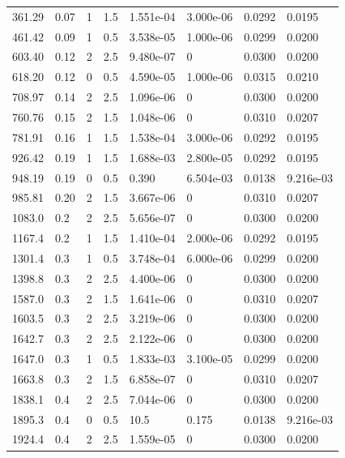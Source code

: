 \documentclass[preview]{standalone}
\begin{document}
{{\begin{tabular}{L{1.2cm}C{1.2cm} C{0.3cm}C{0.5cm} C{1.4cm}C{1.4cm} C{1.4cm}C{1.4cm}}
  361.29  &  0.07  & 1     & 1.5 &  1.551e-04  & 3.000e-06  & 0.0292 &  0.0195   \\ 
  461.42  &  0.09  & 1     & 0.5 &  3.538e-05  & 1.000e-06  & 0.0299 &  0.0200   \\ 
  603.40  &  0.12  & 2     & 2.5 &  9.480e-07  & 0  & 0.0300 &  0.0200   \\ 
  618.20  &  0.12  & 0     & 0.5 &  4.590e-05  & 1.000e-06  & 0.0315 &  0.0210   \\ 
  708.97  &  0.14  & 2     & 2.5 &  1.096e-06  & 0  & 0.0300 &  0.0200   \\ 
  760.76  &  0.15  & 2     & 1.5 &  1.048e-06  & 0  & 0.0310 &  0.0207   \\ 
  781.91  &  0.16  & 1     & 1.5 &  1.538e-04  & 3.000e-06  & 0.0292 &  0.0195   \\ 
  926.42  &  0.19  & 1     & 1.5 &  1.688e-03  & 2.800e-05  & 0.0292 &  0.0195   \\ 
  948.19  &  0.19  & 0     & 0.5 &  0.390  & 6.504e-03  & 0.0138 &  9.216e-03   \\ 
  985.81  &  0.20  & 2     & 1.5 &  3.667e-06  & 0  & 0.0310 &  0.0207   \\ 
  1083.0  &   0.2  & 2     & 2.5 &  5.656e-07  & 0  & 0.0300 &  0.0200   \\ 
  1167.4  &   0.2  & 1     & 1.5 &  1.410e-04  & 2.000e-06  & 0.0292 &  0.0195   \\ 
  1301.4  &   0.3  & 1     & 0.5 &  3.748e-04  & 6.000e-06  & 0.0299 &  0.0200   \\ 
  1398.8  &   0.3  & 2     & 2.5 &  4.400e-06  & 0  & 0.0300 &  0.0200   \\ 
  1587.0  &   0.3  & 2     & 1.5 &  1.641e-06  & 0  & 0.0310 &  0.0207   \\ 
  1603.5  &   0.3  & 2     & 2.5 &  3.219e-06  & 0  & 0.0300 &  0.0200   \\ 
  1642.7  &   0.3  & 2     & 2.5 &  2.122e-06  & 0  & 0.0300 &  0.0200   \\ 
  1647.0  &   0.3  & 1     & 0.5 &  1.833e-03  & 3.100e-05  & 0.0299 &  0.0200   \\ 
  1663.8  &   0.3  & 2     & 1.5 &  6.858e-07  & 0  & 0.0310 &  0.0207   \\ 
  1838.1  &   0.4  & 2     & 2.5 &  7.044e-06  & 0  & 0.0300 &  0.0200   \\ 
  1895.3  &   0.4  & 0     & 0.5 &  10.5  & 0.175  & 0.0138 &  9.216e-03   \\ 
  1924.4  &   0.4  & 2     & 2.5 &  1.559e-05  & 0  & 0.0300 &  0.0200   \\ 

\end{tabular}}}
\end{document}
